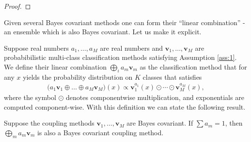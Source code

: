 \begin{proof}
%

\end{proof}

Given several Bayes covariant methods one can form  their ``linear combination'' - an ensemble which is also Bayes covariant. Let us make it explicit.

Suppose real numbers $a_1, \ldots,a_M$ are real numbers and $\boldsymbol{v}_1, \ldots, \boldsymbol{v}_M$ are probabibilistic multi-class classification methods satisfying Assumption \ref{ass:1}. We define their linear combination $\bigoplus_i a_m \boldsymbol{v}_m$ as the classification method that for any $x$ yields the probability distribution on $K$ classes that satisfies
\begin{align*}
 	\bigl(a_1 \boldsymbol{v}_1 \oplus \ldots \oplus a_M \boldsymbol{v}_M\bigr)(x) \propto \boldsymbol{v}_1^{a_1}(x) \odot \cdots \odot \boldsymbol{v}_M^{a_M}(x),
\end{align*}
where the symbol $\odot$ denotes componentwise multiplication, and exponentials are computed component-wise. With this definition we can state the following result.

\begin{prop}
Suppose the coupling methods $\boldsymbol{v}_1, \ldots, \boldsymbol{v}_M$ are Bayes covariant. If $\sum a_m = 1$, then $\bigoplus_m a_m \boldsymbol{v}_m$ is also a Bayes covariant coupling method.
\end{prop}

